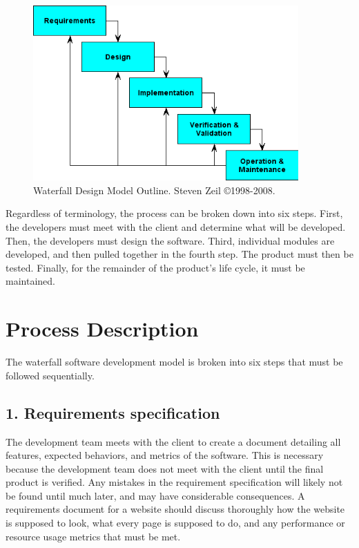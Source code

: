 \documentclass[12pt,letterpaper]{article}
\begin{document}
\begin{figure}[H]
  \centering
  \caption{Waterfall Design Model Outline.  Steven Zeil \copyright 1998-2008.\label{waterfall}}
  \includegraphics[width=4in]{waterfall}
\end{figure}

Regardless of terminology, the process can be broken down into six steps.
First, the developers must meet with the client and determine what will be
developed.  Then, the developers must design the software.  Third, individual
modules are developed, and then pulled together in the fourth step.  The product
must then be tested.  Finally, for the remainder of the product's life cycle, it
must be maintained.

\section*{Process Description}
The waterfall software development model is broken into six steps that must be
followed sequentially.

\subsection*{1. Requirements specification}
The development team meets with the client to create a document detailing all
features, expected behaviors, and metrics of the software.  This is necessary
because the development team does not meet with the client until the final
product is verified.  Any mistakes in the requirement specification will likely
not be found until much later, and may have considerable consequences.  A
requirements document for a website should discuss thoroughly how the website is
supposed to look, what every page is supposed to do, and any performance or
resource usage metrics that must be met.
\end{document}
